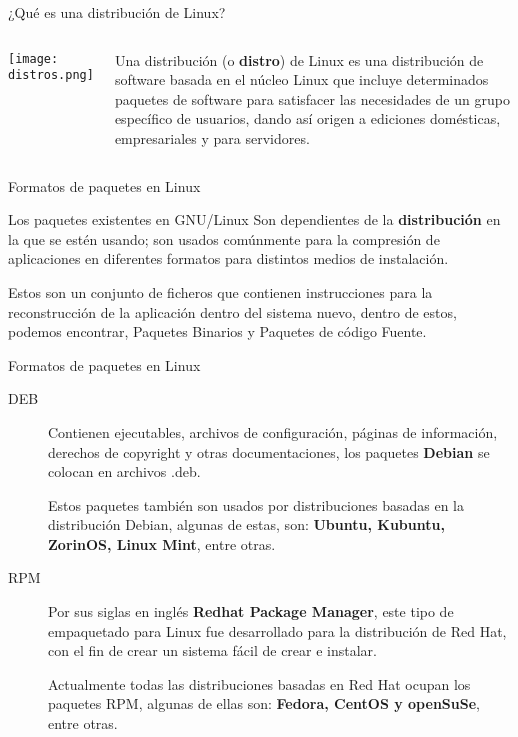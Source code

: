 \begin{frame}[c]{¿Qué es una distribución de Linux?}
    \begin{columns}
        \begin{center}
            \texttt{[image: distros.png]}
        \end{center}
        \pausa
        Una distribución (o \textbf{distro}) de Linux es una distribución
        de software basada en
        el núcleo Linux que incluye determinados paquetes de software para
        satisfacer las necesidades de un grupo específico de usuarios,
        dando así origen a ediciones domésticas, empresariales y para
        servidores.
    \end{columns}
\end{frame}

\begin{frame}[c]{Formatos de paquetes en Linux}

  \begin{block}{Los paquetes existentes en GNU/Linux}
    Son dependientes de la
    \textbf{distribución} en la que se estén usando; son usados comúnmente
    para la compresión de aplicaciones en diferentes formatos para
    distintos medios de instalación.
  \end{block}

  \vspace{\baselineskip}
  Estos son un conjunto de ficheros que contienen instrucciones para la
  reconstrucción de la aplicación dentro del sistema nuevo, dentro de estos,
  podemos encontrar, Paquetes Binarios y Paquetes de código Fuente.
\end{frame}

\begin{frame}[c]{Formatos de paquetes en Linux}
  \begin{description}
    \item [DEB] Contienen ejecutables, archivos de configuración,
      páginas de información, derechos de copyright y otras documentaciones,
      los paquetes \textbf{Debian} se colocan en archivos .deb.

      Estos paquetes también son usados por distribuciones basadas en la
      distribución Debian, algunas de estas, son: \textbf{Ubuntu, Kubuntu,
      ZorinOS, Linux Mint}, entre otras.

    \pausa
    \item [RPM] Por sus siglas en inglés \textbf{Redhat Package Manager},
      este tipo de empaquetado para Linux fue desarrollado para la
      distribución de Red Hat, con el fin de crear un sistema fácil de crear
      e instalar.

      Actualmente todas las distribuciones basadas en Red Hat ocupan los
      paquetes RPM, algunas de ellas son: \textbf{Fedora, CentOS y openSuSe},
      entre otras.
  \end{description}
\end{frame}

